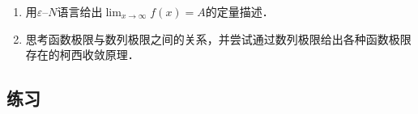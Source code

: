\documentclass[a4paper,punct=CCT]{ctexbook}
\makeatletter
\theoremstyle{definition}
\theoremstyle{remark}
\newif\ifshowex
\newif\ifshowsolp
\renewenvironment{proof}[1][\proofname]{\par
  \pushQED{\qed}%
  \normalfont \topsep6\p@\@plus6\p@\relax
  \trivlist
  \item[]\ignorespaces
}{%
  \popQED\endtrivlist\@endpefalse
}
\makeatother
\begin{document}
\begin{enumerate}
\item 用\(ε\)--\(N\)语言给出\(\lim_{x\to\infty} f(x) = A\)的定量描述．

  \ifshowsolp
  用形式语言的来定义，就是
  \begin{equation*}
    \paren[\big]{\forall ε > 0}
    \paren[\big]{\exists N > 0}
    \paren[\big]{\forall \abs{x} > N}
    \paren[\big]{\abs[\big]{\,f(x) - A} < ε}.
  \end{equation*}
  \fi

\item 思考函数极限与数列极限之间的关系，并尝试通过数列极限给出各种函数极限存在的柯西收敛原理．

  \ifshowsolp
  设函数\(f\)在点\(a\)附近有定义，当
  \begin{equation*}
    \paren[\big]{\forall ε > 0}
    \paren[\big]{\exists δ > 0}
    \paren[\big]{\forall \abs[\big]{x - a} < δ}
    \paren[\big]{\forall \abs[\big]{y - a} < δ}
    \paren[\big]{\abs[\big]{\,f(x) - f(y)} < ε}
  \end{equation*}
  时，我们称\(f\)在点\(a\)处柯西收敛．

  函数的柯西收敛原理无非是说：函数\(f\)在点\(a\)处极限存在的充分必要条件是它在点\(a\)处柯西收敛．

  \begin{proof}
    易证必要性．下面来证一下充分性．对于任意的\(ε > 0\)都存在\(δ > 0\)使得当\(\abs{x - a} < δ,\ \abs{y - a} < δ\)时都有\(\abs*{\,f(x) - f(y)} < ε\)．这时，对于任何收敛于\(a\)的非\(a\)数列\(\Seq{x_n}\)，自然存在一个正整数\(N\)使得：当\(n\)和\(m\)大于\(N\)时，都有\(\abs*{x_n - a} < δ\)和\(\abs*{x_m - a} < δ\)．所以有\(\abs*{\,f(x_n) - f(x_m)} < ε\)．这就说明数列\(\Seq{\,f(x_n)}\)是柯西列，从而收敛．与不同的数列\(\Seq{x_n}\)所对应的数列\(\Seq{\,f(x_n)}\)必然收敛于同一个数．因为假设收敛于不同的两个数，将不同的两个数列可以合并成一个新的数列\(\Seq{\bar x_n}\)，从而推出\(\Seq{\,f(\bar x_n)}\)发散．这和前面的结论时矛盾的．因此，函数\(f\)在点\(a\)处的极限存在．
  \end{proof}
  \fi
\end{enumerate}

\ifshowex
{}
\subsection*{练习}
\end{document}
